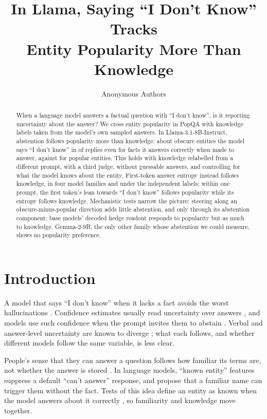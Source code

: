 \documentclass{article}
\title{In Llama, Saying ``I Don't Know'' Tracks\\Entity Popularity More Than Knowledge}
\author{Anonymous Authors}
\newcommand{\idk}{``I don't know''}
\begin{document}
\maketitle

\begin{abstract}
When a language model answers a factual question with \idk, is it reporting uncertainty about the answer? We cross entity popularity in PopQA with knowledge labels taken from the model's own sampled answers. In Llama-3.1-8B-Instruct, abstention follows popularity more than knowledge: about obscure entities the model says \idk{} in \hmLlamaObsKnown{} of replies even for facts it answers correctly when made to answer, against \hmLlamaPopKnown{} for popular entities. This holds with knowledge relabelled from a different prompt, with a third judge, without guessable answers, and controlling for what the model knows about the entity. First-token answer entropy instead follows knowledge, in four model families and under the independent labels; within one prompt, the first token's lean towards \idk{} follows popularity while its entropy follows knowledge. Mechanistic tests narrow the picture: steering along an obscure-minus-popular direction adds little abstention, and only through its abstention component; base models' decoded hedge readout responds to popularity but as much to knowledge. Gemma-2-9B, the only other family whose abstention we could measure, shows no popularity preference.
\end{abstract}

\section{Introduction}

A model that says \idk{} when it lacks a fact avoids the worst hallucinations \citep{kalai2025hallucinate}. Confidence estimates usually read uncertainty over answers \citep{kadavath2022know,kuhn2023semantic,stolfo2024confidence}, and models use such confidence when the prompt invites them to abstain \citep{kumaran2026confidence}. Verbal and answer-level uncertainty are known to diverge \citep{ji2025hedging}; what each follows, and whether different models follow the same variable, is less clear.

People's sense that they can answer a question follows how familiar its terms are, not whether the answer is stored \citep{reder1992,schwartz1992}. In language models, ``known entity'' features suppress a default ``can't answer'' response, and \citet{lindsey2025biology} propose that a familiar name can trigger them without the fact. Tests of this idea define an entity as known when the model answers about it correctly \citep{ferrando2025iknow}, so familiarity and knowledge move together.
\end{document}

